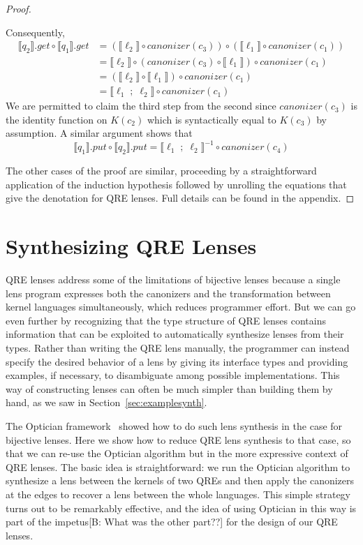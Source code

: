 \documentclass[acmsmall,review,anonymous]{acmart}
\newcommand{\FINISH}[3]{\ifdraft\textcolor{#1}{[#2: #3]}\fi}
\newcommand{\bcp}[1]{\FINISH{dkred}{B}{#1}}
\newcommand{\kw}[1]{\ensuremath{\mathit{#1}}}
\newcommand{\canonizer}{\ensuremath{\kw{canonizer}}}
\newcommand{\get}{\ensuremath{\kw{get}}}
\newcommand{\lput}{\ensuremath{\kw{put}}}
\begin{document}
\begin{proof}
\begin{center}
\end{center}
%
Consequently,
\begin{align*}
\llbracket q_2 \rrbracket.\get \circ \llbracket q_1 \rrbracket.\get &=
(\llbracket \ell_2 \rrbracket \circ \canonizer(c_3)) \circ (\llbracket \ell_1
\rrbracket \circ \canonizer(c_1))\\
&= \llbracket \ell_2 \rrbracket \circ (\canonizer(c_3) \circ \llbracket \ell_1
\rrbracket) \circ \canonizer(c_1)\\
&= (\llbracket \ell_2 \rrbracket \circ \llbracket \ell_1 \rrbracket) \circ
\canonizer(c_1)\\
&= \llbracket \ell_1 \; ; \; \ell_2 \rrbracket \circ \canonizer(c_1)
\end{align*}
We are permitted to claim the third step from the second since
$\canonizer(c_3)$ is the identity function on $K(c_2)$ which is
syntactically equal to $K(c_3)$ by assumption. A similar argument shows that
$$\llbracket q_1 \rrbracket.\lput \circ \llbracket q_2 \rrbracket.\lput =
\llbracket \ell_1 \; ; \; \ell_2 \rrbracket^{-1} \circ
\canonizer(c_4)$$

The other cases of the proof are similar, proceeding by a
straightforward application of the induction hypothesis followed by unrolling
the equations that give the denotation for QRE lenses.  Full details can be
found in the appendix.
\end{proof}

\section{Synthesizing QRE Lenses}
\label{synth}

QRE lenses address some of the limitations of bijective lenses because a single
lens program expresses both the canonizers and the transformation between kernel
languages simultaneously, which reduces programmer effort.  But we can go even
further by recognizing that the type structure of QRE lenses contains
information that can be exploited to automatically synthesize lenses from their
types.  Rather than writing the QRE lens manually, the programmer can instead
specify the desired behavior of a lens by giving its interface types and providing
examples, if necessary, to disambiguate among possible implementations.  This
way of constructing lenses can often be much simpler than building them by
hand, as we saw in Section~\ref{sec:examplesynth}.

The Optician framework~\cite{optician} showed how to do such lens synthesis in
the case for bijective lenses. Here we show how to reduce QRE lens synthesis to
that case, so that we can re-use the Optician algorithm but in the more
expressive context of QRE lenses.  The basic idea is straightforward: we run the
Optician algorithm to synthesize a lens between the kernels of two QREs and then
apply the canonizers at the edges to recover a lens between the whole
languages.  This simple strategy turns out to be remarkably effective, and the
idea of using Optician in this way is part of the impetus\bcp{What was the
  other part??} for the design of our QRE lenses.  
\end{document}
